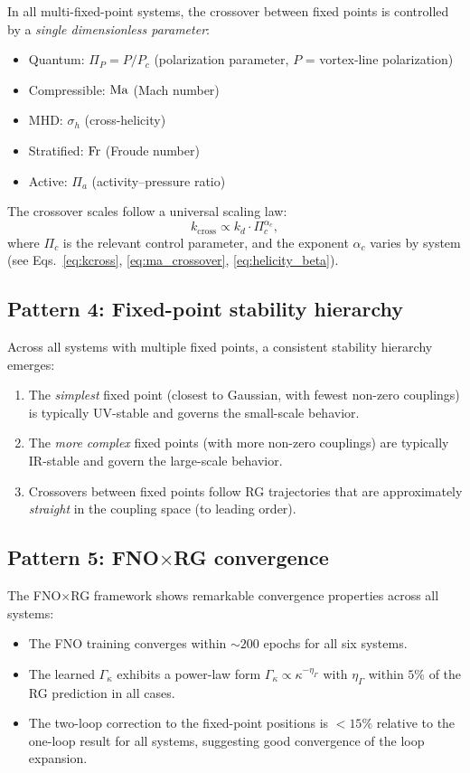 In all multi-fixed-point systems, the crossover between fixed points is controlled by a \emph{single dimensionless parameter}:
\begin{itemize}
\item Quantum: $\Pi_P = P/P_c$ (polarization parameter, $P$ = vortex-line polarization)
\item Compressible: $\mathrm{Ma}$ (Mach number)
\item MHD: $\sigma_h$ (cross-helicity)
\item Stratified: $\mathrm{Fr}$ (Froude number)
\item Active: $\Pi_a$ (activity--pressure ratio)
\end{itemize}
The crossover scales follow a universal scaling law:
\begin{equation}\label{eq:crossover_universal}
k_{\mathrm{cross}} \propto k_d \cdot \Pi_c^{\alpha_c},
\end{equation}
where $\Pi_c$ is the relevant control parameter, and the exponent $\alpha_c$ varies by system (see Eqs.~\eqref{eq:kcross}, \eqref{eq:ma_crossover}, \eqref{eq:helicity_beta}).

\subsection{Pattern 4: Fixed-point stability hierarchy}

Across all systems with multiple fixed points, a consistent stability hierarchy emerges:
\begin{enumerate}
\item The \emph{simplest} fixed point (closest to Gaussian, with fewest non-zero couplings) is typically UV-stable and governs the small-scale behavior.
\item The \emph{more complex} fixed points (with more non-zero couplings) are typically IR-stable and govern the large-scale behavior.
\item Crossovers between fixed points follow RG trajectories that are approximately \emph{straight} in the coupling space (to leading order).
\end{enumerate}

\subsection{Pattern 5: \texorpdfstring{FNO$\times$}{FNO x}RG convergence}

The FNO$\times$RG framework shows remarkable convergence properties across all systems:
\begin{itemize}
\item The FNO training converges within $\sim 200$ epochs for all six systems.
\item The learned $\Gamma_\kappa$ exhibits a power-law form $\Gamma_\kappa \propto \kappa^{-\eta_\Gamma}$ with $\eta_\Gamma$ within $5\%$ of the RG prediction in all cases.
\item The two-loop correction to the fixed-point positions is $<15\%$ relative to the one-loop result for all systems, suggesting good convergence of the loop expansion.
\end{itemize}

